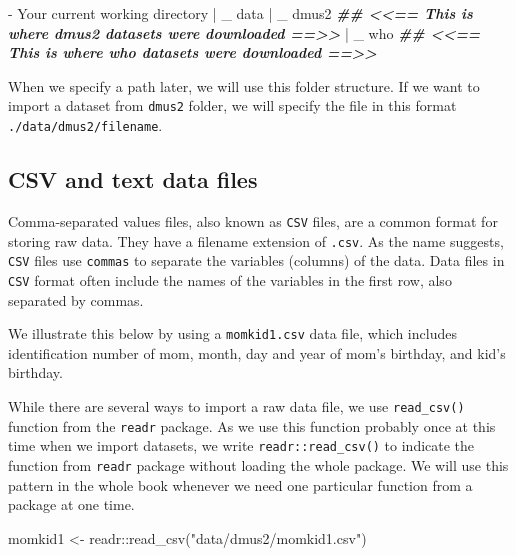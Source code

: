 \documentclass[
]{book}
\newenvironment{Shaded}{\begin{snugshade}}{\end{snugshade}}
\newcommand{\DocumentationTok}[1]{\textcolor[rgb]{0.56,0.35,0.01}{\textbf{\textit{#1}}}}
\newcommand{\FunctionTok}[1]{\textcolor[rgb]{0.00,0.00,0.00}{#1}}
\newcommand{\NormalTok}[1]{#1}
\newcommand{\OtherTok}[1]{\textcolor[rgb]{0.56,0.35,0.01}{#1}}
\newcommand{\SpecialCharTok}[1]{\textcolor[rgb]{0.00,0.00,0.00}{#1}}
\newcommand{\StringTok}[1]{\textcolor[rgb]{0.31,0.60,0.02}{#1}}
\begin{document}
\begin{Shaded}
\begin{Highlighting}[]
\SpecialCharTok{{-}}\NormalTok{ Your current working directory}
    \SpecialCharTok{|}
\NormalTok{    \_ data}
        \SpecialCharTok{|}
\NormalTok{        \_ dmus2     }\DocumentationTok{\#\# \textless{}\textless{}== This is where dmus2 datasets were downloaded ==\textgreater{}\textgreater{} }
        \SpecialCharTok{|}
\NormalTok{        \_ who       }\DocumentationTok{\#\# \textless{}\textless{}== This is where who datasets were downloaded ==\textgreater{}\textgreater{}}
\end{Highlighting}
\end{Shaded}

When we specify a path later, we will use this folder structure. If we want to import a dataset from \texttt{dmus2} folder, we will specify the file in this format \texttt{./data/dmus2/filename}.

\hypertarget{csv-and-text-data-files}{%
\subsection{CSV and text data files}\label{csv-and-text-data-files}}

Comma-separated values files, also known as \texttt{CSV} files, are a common format for storing raw data. They have a filename extension of \texttt{.csv}. As the name suggests, \texttt{CSV} files use \texttt{commas} to separate the variables (columns) of the data. Data files in \texttt{CSV} format often include the names of the variables in the first row, also separated by commas.

We illustrate this below by using a \texttt{momkid1.csv} data file, which includes identification number of mom, month, day and year of mom's birthday, and kid's birthday.

While there are several ways to import a raw data file, we use \texttt{read\_csv()} function from the \texttt{readr} package. As we use this function probably once at this time when we import datasets, we write \texttt{readr::read\_csv()} to indicate the function from \texttt{readr} package without loading the whole package. We will use this pattern in the whole book whenever we need one particular function from a package at one time.

\begin{Shaded}
\begin{Highlighting}[]
\NormalTok{momkid1 }\OtherTok{\textless{}{-}}\NormalTok{ readr}\SpecialCharTok{::}\FunctionTok{read\_csv}\NormalTok{(}\StringTok{"data/dmus2/momkid1.csv"}\NormalTok{)}
\end{Highlighting}
\end{Shaded}
\end{document}
